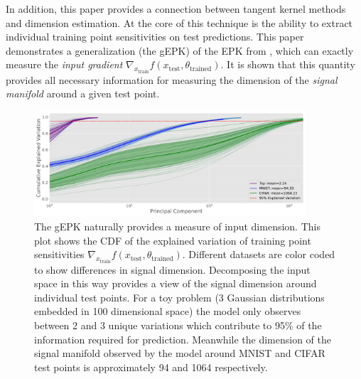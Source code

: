 In addition, this paper provides a connection between tangent kernel methods and dimension estimation.
At the core of this technique is the ability to extract individual training point sensitivities on test predictions.
This paper demonstrates a generalization (the gEPK) of the EPK from \citet{bell2023},  which can exactly measure the \emph{input gradient} $\nabla_{x_\text{train}}f(x_\text{test}, \theta_\text{trained})$.
It is shown that this quantity provides all necessary information for measuring the dimension of the \textit{signal manifold} \citet{srinivas2023} around a given test point.

\begin{figure}[t]
    \centering
    \includegraphics[width=0.9\textwidth]{c4a_figures/dimensionality_chords.pdf}
    \caption{The gEPK naturally provides a measure of input dimension. This plot shows the CDF of the explained variation of training point sensitivities $\nabla_{x_\text{train}}f(x_\text{test}, \theta_\text{trained})$. Different datasets are color coded to show differences in signal dimension. Decomposing the input space in this way provides a view of the signal dimension around individual test points. For a toy problem (3 Gaussian distributions embedded in 100 dimensional space) the model only observes between 2 and 3 unique variations which contribute to 95\% of the information required for prediction. Meanwhile the dimension of the signal manifold observed by the model around MNIST and CIFAR test points is approximately 94 and 1064 respectively. }
    \label{fig:cdf}
\end{figure}
 


